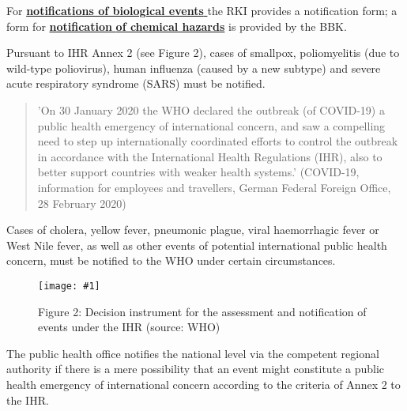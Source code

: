 \documentclass{article}
\newlength{\imgwidth}
\newcommand\scaledgraphics[2]{%
                
\settowidth{\imgwidth}{\texttt{[image: \#1]}}%
                
\setlength{\imgwidth}{\minof{\imgwidth}{#2\textwidth}}%
                
\texttt{[image: \#1]}%
                
}
\begin{document}
For \textbf{\href{https://www.rki.de/DE/Content/Infekt/IfSG/Meldeboegen/Meldung_12/meldung_12_node.html}{notifications of biological events}}\href{https://www.rki.de/DE/Content/Infekt/IfSG/Meldeboegen/Meldung_12/meldung_12_node.html}{ }the RKI provides a notification form; a form for \textbf{\href{https://www.bbk.bund.de/SharedDocs/Kurzmeldungen/BBK/DE/2017/IGV_Meldebogen_Info_WHO_Chemie.html}{notification}}\href{https://www.bbk.bund.de/SharedDocs/Kurzmeldungen/BBK/DE/2017/IGV_Meldebogen_Info_WHO_Chemie.html}{ }\textbf{\href{https://www.bbk.bund.de/SharedDocs/Kurzmeldungen/BBK/DE/2017/IGV_Meldebogen_Info_WHO_Chemie.html}{of chemical hazards}}\textbf{ }is provided by the BBK.


Pursuant to IHR Annex 2 (see Figure 2), cases of smallpox, poliomyelitis (due to wild-type poliovirus), human influenza (caused by a new subtype) and severe acute respiratory syndrome (SARS) must be notified.

\begin{quote}



'On 30 January 2020 the WHO declared the outbreak (of COVID-19) a public health emergency of international concern, and saw a compelling need to step up internationally coordinated efforts to control the outbreak in accordance with the International Health Regulations (IHR), also to better support countries with weaker health systems.' (COVID-19, information for employees and travellers, German Federal Foreign Office, 28 February 2020)


\end{quote}


Cases of cholera, yellow fever, pneumonic plague, viral haemorrhagic fever or West Nile fever, as well as other events of potential international public health concern, must be notified to the WHO under certain circumstances.

\begin{figure}
\scaledgraphics{7cf6d0e9-816a-44b8-9f62-f701ecc8cef6.png}{1}
\caption*{Figure 2: Decision instrument for the assessment and notification of events under the IHR (source: WHO)}\label{F15053051}
\end{figure}





The public health office notifies the national level via the competent regional authority if there is a mere possibility that an event might constitute a public health emergency of international concern according to the criteria of Annex 2 to the IHR.
\end{document}

